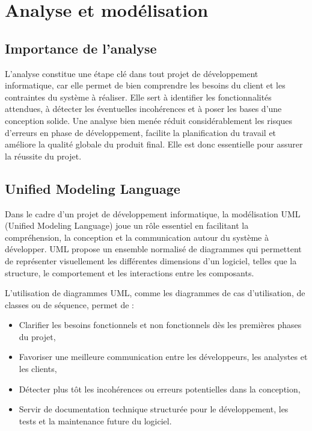 \documentclass[12pt,a4paper]{report}
\begin{document}
	\chapter{Analyse et modélisation}
	
	\section{Importance de l'analyse}
	
	L’analyse constitue une étape clé dans tout projet de développement informatique, car elle permet de bien comprendre les besoins du client et les contraintes du système à réaliser. Elle sert à identifier les fonctionnalités attendues, à détecter les éventuelles incohérences et à poser les bases d’une conception solide. Une analyse bien menée réduit considérablement les risques d’erreurs en phase de développement, facilite la planification du travail et améliore la qualité globale du produit final. Elle est donc essentielle pour assurer la réussite du projet.	
	
	\section{Unified Modeling Language}
	
	Dans le cadre d’un projet de développement informatique, la modélisation UML (Unified Modeling Language) joue un rôle essentiel en facilitant la compréhension, la conception et la communication autour du système à développer. UML propose un ensemble normalisé de diagrammes qui permettent de représenter visuellement les différentes dimensions d’un logiciel, telles que la structure, le comportement et les interactions entre les composants.
	
	L’utilisation de diagrammes UML, comme les diagrammes de cas d’utilisation, de classes ou de séquence, permet de :
	
	\begin{itemize}
		\item Clarifier les besoins fonctionnels et non fonctionnels dès les premières phases du projet,		
		\item Favoriser une meilleure communication entre les développeurs, les analystes et les clients,		
		\item Détecter plus tôt les incohérences ou erreurs potentielles dans la conception,		
		\item Servir de documentation technique structurée pour le développement, les tests et la maintenance future du logiciel.
	\end{itemize}
	
\end{document}
